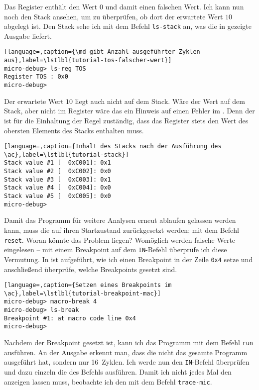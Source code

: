 Das Register  enthält den Wert $0$ und damit einen falschen Wert. Ich kann nun noch den Stack ansehen, um zu überprüfen, ob dort der erwartete Wert $10$ abgelegt ist. Den Stack sehe ich mit dem Befehl \texttt{ls-stack} an, was die in  gezeigte Ausgabe liefert.

\begin{lstlisting}[language=,caption={\md gibt Anzahl ausgeführter Zyklen aus},label=\lstlbl{tutorial-tos-falscher-wert}]
micro-debug> ls-reg TOS
Register TOS : 0x0
micro-debug> 
\end{lstlisting}

Der erwartete Wert $10$ liegt auch nicht auf dem Stack. Wäre der Wert auf dem Stack, aber nicht im Register  wäre das ein Hinweis auf einen Fehler im \mac. Denn der \mac ist für die Einhaltung der Regel zuständig, dass das Register  stets den Wert des obersten Elements des Stacks enthalten muss.

\begin{lstlisting}[language=,caption={Inhalt des Stacks nach der Ausführung des \ac},label=\lstlbl{tutorial-stack}]
Stack value #1 [  0xC001]: 0x1
Stack value #2 [  0xC002]: 0x0
Stack value #3 [  0xC003]: 0x1
Stack value #4 [  0xC004]: 0x0
Stack value #5 [  0xC005]: 0x0
micro-debug> 
\end{lstlisting}

Damit das Programm für weitere Analysen erneut ablaufen gelassen werden kann, muss die \mic auf ihren Startzustand zurückgesetzt werden; mit dem Befehl \texttt{reset}. Woran könnte das Problem liegen? Womöglich werden falsche Werte eingelesen -- mit einem Breakpoint auf dem \texttt{IN}-Befehl überprüfe ich diese Vermutung. In  ist aufgeführt, wie ich einen Breakpoint in der Zeile \texttt{0x4} setze und anschließend überprüfe, welche Breakpoints gesetzt sind.

\begin{lstlisting}[language=,caption={Setzen eines Breakpoints im \ac},label=\lstlbl{tutorial-breakpoint-mac}]
micro-debug> macro-break 4
micro-debug> ls-break
Breakpoint #1: at macro code line 0x4
micro-debug> 
\end{lstlisting}

Nachdem der Breakpoint gesetzt ist, kann ich das Programm mit dem Befehl \texttt{run} ausführen. An der Ausgabe erkennt man, dass die \mic nicht das gesamte Programm ausgeführt hat, sondern nur 16~Zyklen. Ich werde nun den \texttt{IN}-Befehl überprüfen und dazu einzeln die \mai des Befehls ausführen. Damit ich nicht jedes Mal den \mac anzeigen lassen muss, beobachte ich den \mac mit dem Befehl \texttt{trace-mic}.

